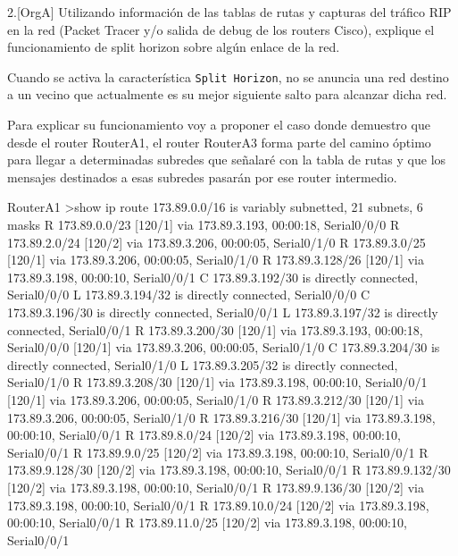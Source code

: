 \begin{ejer}
2.[OrgA] Utilizando información de las tablas de rutas y capturas del tráfico RIP en la red (Packet Tracer y/o salida de debug de los routers Cisco), explique el funcionamiento de split horizon sobre algún enlace de la red.
\end{ejer}

\par Cuando se activa la característica \texttt{Split Horizon}, no se anuncia una red destino a un vecino que actualmente es su mejor siguiente salto para alcanzar dicha red.
\par Para explicar su funcionamiento voy a proponer el caso donde demuestro que desde el router RouterA1, el router RouterA3 forma parte del camino óptimo para llegar a determinadas subredes que señalaré con la tabla de rutas y que los mensajes destinados a esas subredes pasarán por ese router intermedio.

\begin{listing}[style=consola]
RouterA1 >show ip route
     173.89.0.0/16 is variably subnetted, 21 subnets, 6 masks
R       173.89.0.0/23 [120/1] via 173.89.3.193, 00:00:18, Serial0/0/0
R       173.89.2.0/24 [120/2] via 173.89.3.206, 00:00:05, Serial0/1/0
R       173.89.3.0/25 [120/1] via 173.89.3.206, 00:00:05, Serial0/1/0
R       173.89.3.128/26 [120/1] via 173.89.3.198, 00:00:10, Serial0/0/1
C       173.89.3.192/30 is directly connected, Serial0/0/0
L       173.89.3.194/32 is directly connected, Serial0/0/0
C       173.89.3.196/30 is directly connected, Serial0/0/1
L       173.89.3.197/32 is directly connected, Serial0/0/1
R       173.89.3.200/30 [120/1] via 173.89.3.193, 00:00:18, Serial0/0/0
                        [120/1] via 173.89.3.206, 00:00:05, Serial0/1/0
C       173.89.3.204/30 is directly connected, Serial0/1/0
L       173.89.3.205/32 is directly connected, Serial0/1/0
R       173.89.3.208/30 [120/1] via 173.89.3.198, 00:00:10, Serial0/0/1
                        [120/1] via 173.89.3.206, 00:00:05, Serial0/1/0
R       173.89.3.212/30 [120/1] via 173.89.3.206, 00:00:05, Serial0/1/0
R       173.89.3.216/30 [120/1] via 173.89.3.198, 00:00:10, Serial0/0/1
R       173.89.8.0/24 [120/2] via 173.89.3.198, 00:00:10, Serial0/0/1
R       173.89.9.0/25 [120/2] via 173.89.3.198, 00:00:10, Serial0/0/1
R       173.89.9.128/30 [120/2] via 173.89.3.198, 00:00:10, Serial0/0/1
R       173.89.9.132/30 [120/2] via 173.89.3.198, 00:00:10, Serial0/0/1
R       173.89.9.136/30 [120/2] via 173.89.3.198, 00:00:10, Serial0/0/1
R       173.89.10.0/24 [120/2] via 173.89.3.198, 00:00:10, Serial0/0/1
R       173.89.11.0/25 [120/2] via 173.89.3.198, 00:00:10, Serial0/0/1
\end{listing} 

